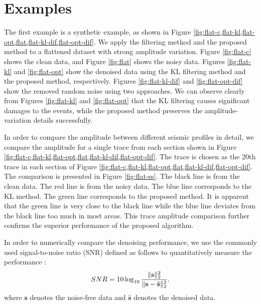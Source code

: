 \section{Examples}
The first example is a synthetic example, as shown in Figure \ref{fig:flat-c,flat-kl,flat-opt,flat,flat-kl-dif,flat-opt-dif}. We apply the  filtering method  and the proposed method to a flattened dataset with strong amplitude variation. Figure \ref{fig:flat-c} shows the clean data, and Figure \ref{fig:flat} shows the noisy data. Figures \ref{fig:flat-kl} and \ref{fig:flat-opt} show the denoised data using the KL filtering method and the proposed method, respectively. Figures \ref{fig:flat-kl-dif} and \ref{fig:flat-opt-dif} show the removed random noise using two approaches. We can observe clearly from Figures \ref{fig:flat-kl} and \ref{fig:flat-opt} that the KL filtering causes significant damages to the events, while the proposed method preserves the amplitude-variation details successfully. 

In order to compare the amplitude between different seismic profiles in detail, we compare the amplitude for a single trace from each section shown in Figure \ref{fig:flat-c,flat-kl,flat-opt,flat,flat-kl-dif,flat-opt-dif}. The trace is chosen as the 20th trace in each section of Figure \ref{fig:flat-c,flat-kl,flat-opt,flat,flat-kl-dif,flat-opt-dif}. The comparison is presented in Figure \ref{fig:flat-ss}.  The black line is from the clean data. The red line is from the noisy data. The blue line corresponds to the KL method. The green line corresponds to the proposed method. It is apparent that the green line is very close to the black line while the blue line deviates from the black line too much in most areas. This trace amplitude comparison  further confirms the superior performance of the proposed algorithm. 

In order to numerically compare the denoising performance, we use the commonly used signal-to-noise ratio (SNR) defined as follows to quantitatively measure the performance \cite[]{yangkang2015ortho}:
\begin{equation}
\label{eq:dsnr}
SNR=10\log_{10}\frac{\Arrowvert \mathbf{s} \Arrowvert_2^2}{\Arrowvert \mathbf{s} -\hat{\mathbf{s}}\Arrowvert_2^2}.
\end{equation}
where $\mathbf{s}$ denotes the noise-free data and $\hat{\mathbf{s}}$ denotes the denoised data. 

